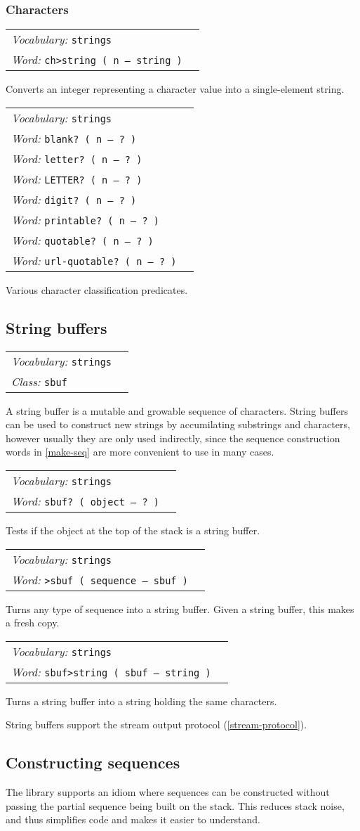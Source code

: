 \documentclass{book}
\newcommand{\vocabulary}[1]{\emph{Vocabulary:} \texttt{#1}&\\}
\newcommand{\ordinaryword}[2]{\index{\texttt{#1}}\emph{Word:} \texttt{#2}&\\}
\newcommand{\classword}[1]{\index{\texttt{#1}}\emph{Class:} \texttt{#1}&\\}
\newcommand{\wordtable}[1]{

\begin{tabularx}{12cm}[t]{lX}
\hline
#1
\hline
\end{tabularx}

}
\begin{document}
\subsubsection{Characters}

\wordtable{
\vocabulary{strings}
\ordinaryword{ch>string}{ch>string ( n -- string )}
}
Converts an integer representing a character value into a single-element string.
\wordtable{
\vocabulary{strings}
\ordinaryword{blank?}{blank?~( n -- ?~)}
\ordinaryword{letter?}{letter?~( n -- ?~)}
\ordinaryword{LETTER?}{LETTER?~( n -- ?~)}
\ordinaryword{digit?}{digit?~( n -- ?~)}
\ordinaryword{printable?}{printable?~( n -- ?~)}
\ordinaryword{quotable?}{quotable?~( n -- ?~)}
\ordinaryword{url-quotable?}{url-quotable?~( n -- ?~)}
}
Various character classification predicates.

\subsection{\label{string-buffers}String buffers}

\sbufglos
\wordtable{
\vocabulary{strings}
\classword{sbuf}
}
A string buffer is a mutable and growable sequence of characters. String buffers can be used to construct new strings by accumilating substrings and characters, however usually they are only used indirectly, since the sequence construction words in \ref{make-seq} are more convenient to use in many cases.
\wordtable{
\vocabulary{strings}
\ordinaryword{sbuf?}{sbuf?~( object -- ?~)}
}
Tests if the object at the top of the stack is a string buffer.
\wordtable{
\vocabulary{strings}
\ordinaryword{>sbuf}{>sbuf~( sequence -- sbuf )}
}
Turns any type of sequence into a string buffer. Given a string buffer, this makes a fresh copy.
\wordtable{
\vocabulary{strings}
\ordinaryword{sbuf>string}{sbuf>string~( sbuf -- string )}
}
Turns a string buffer into a string holding the same characters.

String buffers support the stream output protocol (\ref{stream-protocol}).

\subsection{\label{make-seq}Constructing sequences}

The library supports an idiom where sequences can be constructed without passing the partial sequence being built on the stack. This reduces stack noise, and thus simplifies code and makes it easier to understand.
\end{document}
